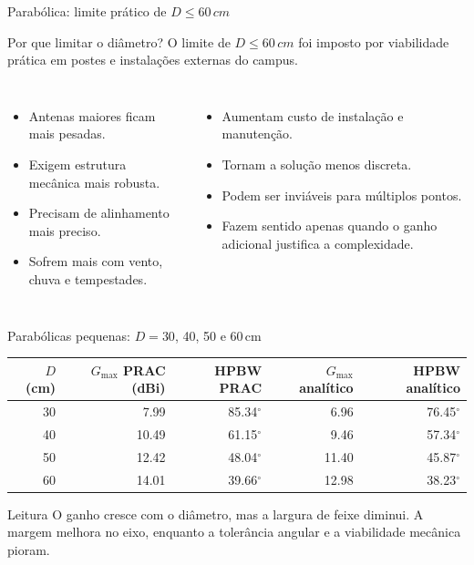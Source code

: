 \documentclass[aspectratio=169]{beamer}
\newcommand{\SI}[2]{#1\,#2}
\begin{document}
\begin{frame}{Parabólica: limite prático de $D \leq \SI{60}{cm}$}
\small
\begin{block}{Por que limitar o diâmetro?}
O limite de $D \leq \SI{60}{cm}$ foi imposto por viabilidade prática em postes e instalações externas do campus.
\end{block}
\begin{columns}[T,onlytextwidth]
\begin{itemize}
  \item Antenas maiores ficam mais pesadas.
  \item Exigem estrutura mecânica mais robusta.
  \item Precisam de alinhamento mais preciso.
  \item Sofrem mais com vento, chuva e tempestades.
\end{itemize}
\begin{itemize}
  \item Aumentam custo de instalação e manutenção.
  \item Tornam a solução menos discreta.
  \item Podem ser inviáveis para múltiplos pontos.
  \item Fazem sentido apenas quando o ganho adicional justifica a complexidade.
\end{itemize}
\end{columns}
\end{frame}

\begin{frame}{Parabólicas pequenas: $D=30$, 40, 50 e \SI{60}{cm}}
\small
\begin{table}
\centering
\begin{tabular}{rrrrr}
\toprule
$D$ (cm) & $G_{\max}$ PRAC (dBi) & HPBW PRAC & $G_{\max}$ analítico & HPBW analítico \\
\midrule
30 & 7.99 & 85.34$^\circ$ & 6.96 & 76.45$^\circ$ \\
40 & 10.49 & 61.15$^\circ$ & 9.46 & 57.34$^\circ$ \\
50 & 12.42 & 48.04$^\circ$ & 11.40 & 45.87$^\circ$ \\
60 & 14.01 & 39.66$^\circ$ & 12.98 & 38.23$^\circ$ \\
\bottomrule
\end{tabular}
\end{table}
\begin{block}{Leitura}
O ganho cresce com o diâmetro, mas a largura de feixe diminui. A margem melhora no eixo, enquanto a tolerância angular e a viabilidade mecânica pioram.
\end{block}
\end{frame}
\end{document}
